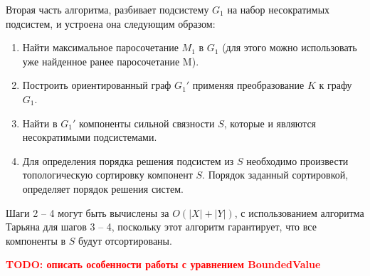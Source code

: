 Вторая часть алгоритма, разбивает подсистему $G_1$ на набор несократимых подсистем, и устроена она следующим образом:
\begin{enumerate}
    \item 
        Найти максимальное паросочетание $M_1$ в $G_1$ (для этого можно использовать уже найденное ранее паросочетание M).
    \item
        Построить ориентированный граф $G_1'$ применяя преобразование $K$ к графу $G_1$.
    \item
        Найти в $G_1'$ компоненты сильной связности $S$, которые и являются несократимыми подсистемами.
    \item
        Для определения порядка решения подсистем из $S$ необходимо произвести топологическую сортировку компонент $S$. Порядок заданный сортировкой, определяет порядок решения систем.
\end{enumerate}
Шаги 2 -- 4 могут быть вычислены за $O(|X| + |Y|)$, с использованием алгоритма Тарьяна \cite{tarjan1972depth} для шагов 3 -- 4, поскольку этот алгоритм гарантирует, что все компоненты в $S$ будут отсортированы.

\textcolor{red}{\textbf{TODO: описать особенности работы с уравнением BoundedValue}}